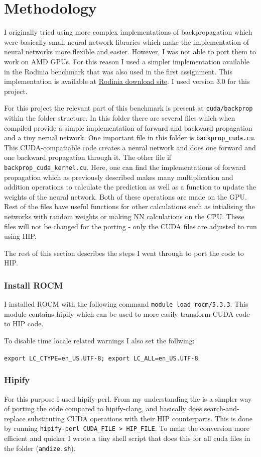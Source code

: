 \documentclass[a4paper,11pt]{scrartcl}
\begin{document}
\section{Methodology}
I originally tried using more complex implementations of backpropagation which were basically small neural network libraries which make the implementation of neural networks more flexible and easier. However, I was not able to port them to work on AMD GPUs. For this reason I used a simpler implementation available in the Rodinia benchmark that was also used in the first assignment. This implementation is available at \href{http://lava.cs.virginia.edu/Rodinia/download.htm}{Rodinia download site}. I used version 3.0 for this project.

For this project the relevant part of this benchmark is present at \verb|cuda/backprop| within the folder structure. In this folder there are several files which when compiled provide a simple implementation of forward and backward propagation and a tiny nerual network. One important file in this folder is \verb|backprop_cuda.cu|. This CUDA-compatiable code creates a neural network and does one forward and one backward propagation through it. The other file if \verb|backprop_cuda_kernel.cu|. Here, one can find the implementations of forward propagation which as previously described makes many multiplication and addition operations to calculate the prediction as well as a function to update the weights of the neural network. Both of these operations are made on the GPU. Rest of the files have useful functions for other calculations such as intialising the networks with random weights or making NN calculations on the CPU. These files will not be changed for the porting - only the CUDA files are adjusted to run using HIP.

The rest of this section describes the steps I went through to port the code to HIP.

\subsubsection*{Install ROCM}
I installed ROCM with the following command \verb|module load rocm/5.3.3|. This module contains hipify which can be used to more easily transform CUDA code to HIP code.

To disable time locale related warnings I also set the follwing:

\verb|export LC_CTYPE=en_US.UTF-8; export LC_ALL=en_US.UTF-8|.

\subsubsection*{Hipify}
For this purpose I used hipify-perl. From my understanding the is a simpler way of porting the code compared to hipify-clang, and basically does search-and-replace substituting CUDA operations with their HIP counterparts. This is done by running \verb|hipify-perl CUDA_FILE > HIP_FILE|. To make the conversion more efficient and quicker I wrote a tiny shell script that does this for all cuda files in the folder (\verb|amdize.sh|).
\end{document}
